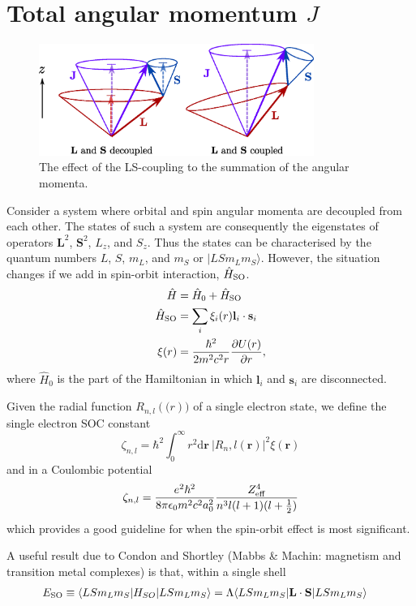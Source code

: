 \section{Total angular momentum $J$}
\begin{figure}[h!]
\centering
\includegraphics[width=0.8\textwidth]{magnetism/figures/angular_momenta_sums}
\caption{The effect of the LS-coupling to the summation of the angular momenta.\label{fig:angular_momenta_sums}}
\end{figure}
Consider a system where orbital and spin angular momenta are decoupled from each other. The states of such a system are consequently the eigenstates of operators $\mathbf{L}^2$, $\mathbf{S}^2$, $L_z$, and  $S_z$. Thus the states can be characterised by the quantum numbers $L$, $S$, $m_L$, and $m_S$  or $|LSm_Lm_S\rangle$. However, the situation changes if we add in spin-orbit interaction, $\Hat{H}_{\rm SO}$. 
\begin{align}
\hat{H} &= \hat{H}_0 + \Hat{H}_{\rm SO}\\
\Hat{H}_{\rm SO} &= \sum_i\xi_i(r) \mathbf{l}_i \cdot \mathbf{s}_i\\
\xi(r) &= \frac{\hbar^2}{2m^2c^2r}\frac{\partial U(r)}{\partial r},
\end{align}
where $\hat{H}_0$ is the part of the Hamiltonian in which $\mathbf{l}_i$ and $\mathbf{s}_i$ are disconnected.

Given the radial function $R_{n,l}(\mathbf(r))$ of a single electron state, we define the single electron SOC constant 
\begin{equation}
\zeta_{n,l} = \hbar^2\int_0^\infty r^2\mathrm{d}\mathbf{r}~|R_n,l(\mathbf{r})|^2\xi(\mathbf{r})
\end{equation}
and in a Coulombic potential
\begin{equation}
\zeta_{n,l}  = \frac{e^2\hbar^2}{8\pi\epsilon_0m^2c^2a_0^2}\frac{Z_{\rm eff}^4}{n^3l(l+1)(l+\frac{1}{2})}
\end{equation}
which provides a good guideline for when the spin-orbit effect is most significant.

A useful result due to Condon and Shortley (Mabbs \& Machin: magnetism and transition metal complexes) is that, within a single shell 
\begin{align}
E_{\rm SO}  &\equiv \langle LSm_Lm_S|H_{SO}|LSm_Lm_S\rangle = \Lambda \langle LSm_Lm_S|\mathbf{L}\cdot\mathbf{S}|LSm_Lm_S\rangle
\end{align}


